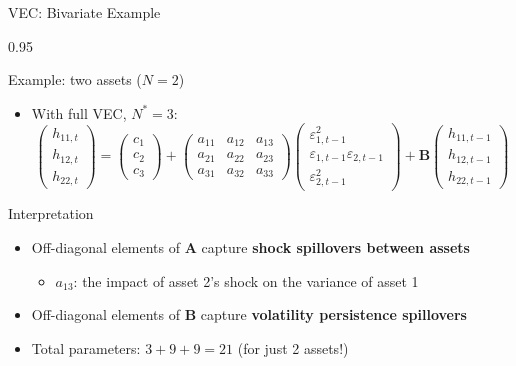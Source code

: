 \documentclass[9pt, aspectratio=169, t]{beamer}
\begin{document}
\begin{frame}{VEC: Bivariate Example}
    \begin{cminipage}{0.95\textwidth}
    {\footnotesize
    \begin{exampleblock}{Example: two assets ($N=2$)}
        \begin{itemize}\setlength{\itemsep}{0pt}
            \item With full VEC, $N^* = 3$:
            \[
                \begin{pmatrix} h_{11,t} \\ h_{12,t} \\ h_{22,t} \end{pmatrix} = \begin{pmatrix} c_1 \\ c_2 \\ c_3 \end{pmatrix} + \begin{pmatrix} a_{11} & a_{12} & a_{13} \\ a_{21} & a_{22} & a_{23} \\ a_{31} & a_{32} & a_{33} \end{pmatrix} \begin{pmatrix} \varepsilon_{1,t-1}^2 \\ \varepsilon_{1,t-1}\varepsilon_{2,t-1} \\ \varepsilon_{2,t-1}^2 \end{pmatrix} + \mathbf{B} \begin{pmatrix} h_{11,t-1} \\ h_{12,t-1} \\ h_{22,t-1} \end{pmatrix}
            \]
        \end{itemize}
    \end{exampleblock}
    \begin{block}{Interpretation}
        \begin{itemize}\setlength{\itemsep}{0pt}
            \item Off-diagonal elements of $\mathbf{A}$ capture \textbf{shock spillovers between assets}
                \begin{itemize}\setlength{\itemsep}{0pt}
                    \item $a_{13}$: the impact of asset 2's shock on the variance of asset 1
                \end{itemize}
            \item Off-diagonal elements of $\mathbf{B}$ capture \textbf{volatility persistence spillovers}
            \item Total parameters: $3 + 9 + 9 = 21$ (for just 2 assets!)
        \end{itemize}
    \end{block}
    }
    \end{cminipage}
\end{frame}
\end{document}
